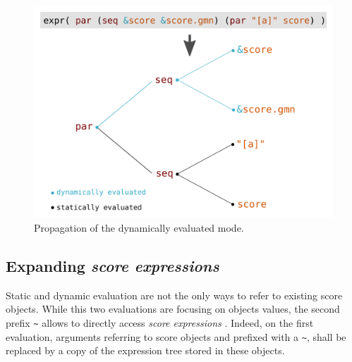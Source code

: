 \documentclass{article}
\newcommand{\OSC}[1]{\texttt{#1}}
\newcommand{\sExpr}{\emph{score expressions} }
\newcommand{\lowTilde} 		{\textasciitilde}
\begin{document}
\begin{figure}[th]
\centering
\includegraphics[width=1\columnwidth]{imgs/dynamicEval}
\caption{Propagation of the dynamically evaluated mode.
\label{fig:dynamicEval}}
\end{figure}


\subsection{Expanding \sExpr}

Static and dynamic evaluation are not the only ways to refer to existing score objects. While this two evaluations are focusing on objects values, the second prefix \OSC{\lowTilde} allows to directly access \sExpr. Indeed, on the first evaluation, arguments referring to score objects and prefixed with a \OSC{\lowTilde}, shall be replaced by a copy of the expression tree stored in these objects.
\end{document}
